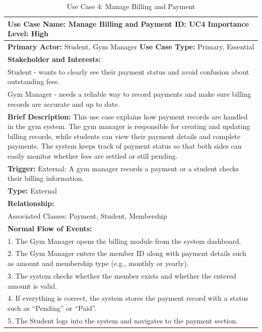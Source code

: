 \documentclass[12pt, a4paper]{article}
\begin{document}
\begin{table}[H]
    \centering
    \caption{Use Case 4: Manage Billing and Payment}
    \renewcommand{\arraystretch}{1.3}
    \begin{tabularx}{\textwidth}{X}
        \hline
        \textbf{Use Case Name:} Manage Billing and Payment \hfill \textbf{ID:} UC4 \hfill \textbf{Importance Level:} High \\
        \hline
        \textbf{Primary Actor:} Student, Gym Manager \hfill \textbf{Use Case Type:} Primary, Essential \\
        \textbf{Stakeholder and Interests:} \\
        Student - wants to clearly see their payment status and avoid confusion about outstanding fees. \\
        Gym Manager - needs a reliable way to record payments and make sure billing records are accurate and up to date. \\
        \textbf{Brief Description:} This use case explains how payment records are handled in the gym system. The gym manager is responsible for creating and updating billing records, while students can view their payment details and complete payments. The system keeps track of payment status so that both sides can easily monitor whether fees are settled or still pending. \\
        \textbf{Trigger:} External: A gym manager records a payment or a student checks their billing information. \\
        \textbf{Type:} External \\
        \textbf{Relationship:} \\
        Associated Classes: Payment, Student, Membership \\
        \textbf{Normal Flow of Events:} \\
        1. The Gym Manager opens the billing module from the system dashboard. \\
        2. The Gym Manager enters the member ID along with payment details such as amount and membership type (e.g., monthly or yearly). \\
        3. The system checks whether the member exists and whether the entered amount is valid. \\
        4. If everything is correct, the system stores the payment record with a status such as “Pending” or “Paid”. \\
        5. The Student logs into the system and navigates to the payment section. \\

\end{tabularx}
\end{table}
\end{document}
